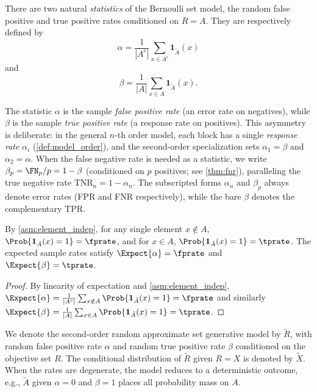 There are two natural \emph{statistics} of the Bernoulli set model, the random false positive and true positive rates conditioned on $R = A$.
They are respectively defined by
\begin{equation}
\label{def:sample_fprate}
	\alpha = \frac{1}{|A^c|} \sum_{x \in A^c} \mathbf{1}_{\tilde{A}}(x)
\end{equation}
and
\begin{equation}
\label{def:sample_tprate}
	\beta = \frac{1}{|A|} \sum_{x \in A} \mathbf{1}_{\tilde{A}}(x).
\end{equation}
\begin{remark}
\label{rem:alpha_beta_convention}
The statistic $\alpha$ is the sample \emph{false positive rate} (an error rate on negatives), while $\beta$ is the sample \emph{true positive rate} (a response rate on positives).
This asymmetry is deliberate: in the general $n$-th order model, each block has a single \emph{response rate} $\alpha_i$ (\cref{def:model_order}), and the second-order specialization sets $\alpha_1 = \beta$ and $\alpha_2 = \alpha$.
When the false negative rate is needed as a statistic, we write $\beta_p = \FN_p / p = 1 - \beta$ (conditioned on $p$ positives; see \cref{thm:fnr}), paralleling the true negative rate $\mathrm{TNR}_n = 1 - \alpha_n$.
The subscripted forms $\alpha_n$ and $\beta_p$ always denote error rates (FPR and FNR respectively), while the bare $\beta$ denotes the complementary TPR.
\end{remark}
\begin{proposition}
\label{prop:element_rates}
By \cref{asm:element_indep}, for any single element $x \notin A$,
$\Prob{\mathbf{1}_{\tilde{A}}(x) = 1} = \fprate$, and for $x \in A$,
$\Prob{\mathbf{1}_{\tilde{A}}(x) = 1} = \tprate$.
The expected sample rates satisfy $\Expect{\alpha} = \fprate$ and $\Expect{\beta} = \tprate$.
\end{proposition}
\begin{proof}
By linearity of expectation and \cref{asm:element_indep},
$\Expect{\alpha} = \frac{1}{|A^c|}\sum_{x \notin A} \Prob{\mathbf{1}_{\tilde{A}}(x) = 1} = \fprate$
and similarly $\Expect{\beta} = \frac{1}{|A|}\sum_{x \in A} \Prob{\mathbf{1}_{\tilde{A}}(x) = 1} = \tprate$.
\end{proof}



We denote the second-order random approximate set generative model by $\tilde{R}$, with random false positive rate $\alpha$ and random true positive rate $\beta$ conditioned on the objective set $R$.
The conditional distribution of $\tilde{R}$ given $R = X$ is denoted by $\tilde{X}$.
When the rates are degenerate, the model reduces to a deterministic outcome, e.g., $\tilde{A}$ given $\alpha = 0$ and $\beta = 1$ places all probability mass on $A$.

